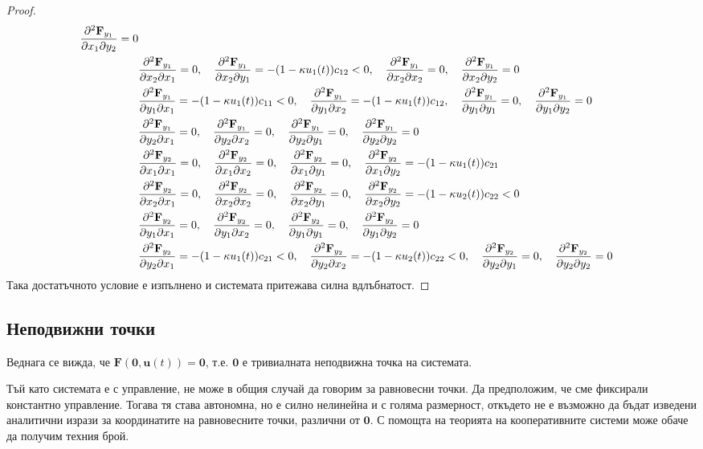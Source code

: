 \begin{proof}
{\begin{align*}
    \pdv{\mathbf{F}_{y_1}}{x_1}{y_2} = 0 \\
    &\pdv{\mathbf{F}_{y_1}}{x_2}{x_1} = 0, \quad
    \pdv{\mathbf{F}_{y_1}}{x_2}{y_1} = -(1-\kappa u_1(t))c_{12} < 0, \quad
    \pdv{\mathbf{F}_{y_1}}{x_2}{x_2} = 0, \quad
    \pdv{\mathbf{F}_{y_1}}{x_2}{y_2} = 0 \\
    &\pdv{\mathbf{F}_{y_1}}{y_1}{x_1} = -(1-\kappa u_1(t))c_{11} < 0, \quad
    \pdv{\mathbf{F}_{y_1}}{y_1}{x_2} = -(1-\kappa u_1(t))c_{12}, \quad
    \pdv{\mathbf{F}_{y_1}}{y_1}{y_1} = 0, \quad
    \pdv{\mathbf{F}_{y_1}}{y_1}{y_2} = 0 \\
    &\pdv{\mathbf{F}_{y_1}}{y_2}{x_1} = 0, \quad
    \pdv{\mathbf{F}_{y_1}}{y_2}{x_2} = 0, \quad
    \pdv{\mathbf{F}_{y_1}}{y_2}{y_1} = 0, \quad
    \pdv{\mathbf{F}_{y_1}}{y_2}{y_2} = 0 \\
    &\pdv{\mathbf{F}_{y_2}}{x_1}{x_1} = 0, \quad
    \pdv{\mathbf{F}_{y_2}}{x_1}{x_2} = 0, \quad
    \pdv{\mathbf{F}_{y_2}}{x_1}{y_1} = 0, \quad
    \pdv{\mathbf{F}_{y_2}}{x_1}{y_2} = -(1-\kappa u_1(t)) c_{21} \\
    &\pdv{\mathbf{F}_{y_2}}{x_2}{x_1} = 0, \quad
    \pdv{\mathbf{F}_{y_2}}{x_2}{x_2} = 0, \quad
    \pdv{\mathbf{F}_{y_2}}{x_2}{y_1} = 0, \quad
    \pdv{\mathbf{F}_{y_2}}{x_2}{y_2} = -(1-\kappa u_2(t)) c_{22} < 0 \\
    &\pdv{\mathbf{F}_{y_2}}{y_1}{x_1} = 0, \quad
    \pdv{\mathbf{F}_{y_2}}{y_1}{x_2} = 0, \quad
    \pdv{\mathbf{F}_{y_2}}{y_1}{y_1} = 0, \quad
    \pdv{\mathbf{F}_{y_2}}{y_1}{y_2} = 0 \\
    &\pdv{\mathbf{F}_{y_2}}{y_2}{x_1} = -(1-\kappa u_1(t)) c_{21} < 0, \quad
    \pdv{\mathbf{F}_{y_2}}{y_2}{x_2} = -(1-\kappa u_2(t)) c_{22} < 0, \quad
    \pdv{\mathbf{F}_{y_2}}{y_2}{y_1} = 0, \quad
    \pdv{\mathbf{F}_{y_2}}{y_2}{y_2} = 0
  \end{align*}
}
Така достатъчното условие е изпълнено и системата притежава силна вдлъбнатост.
\end{proof}


\subsection{Неподвижни точки}
Веднага се вижда, че $\mathbf{F}(\mathbf{0}, \mathbf{u}(t)) = \mathbf{0}$, т.е. $\mathbf{0}$ е тривиалната неподвижна точка на системата.

Тъй като системата е с управление, не може в общия случай да говорим за равновесни точки. Да предположим, че сме фиксирали константно управление. Тогава тя става автономна, но е силно нелинейна и с голяма размерност, откъдето не е възможно да бъдат изведени аналитични изрази за координатите на равновесните точки, различни от  $\mathbf{0}$. С помощта на теорията на кооперативните системи може обаче да получим техния брой.

